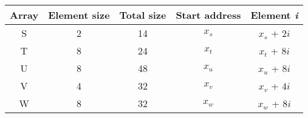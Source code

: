 \documentclass{article}
\begin{document}
\begin{tabular}{c c c c c}
	Array & Element size & Total size & Start address & Element \textit{i} \\
	\hline
	S & 2 & 14 & $x_s$ & $x_s$ + $2i$ \\
	T & 8 & 24 & $x_t$ & $x_t$ + $8i$ \\ 
	U & 8 & 48 & $x_u$ & $x_u$ + $8i$ \\
	V & 4 & 32 & $x_v$ & $x_v$ + $4i$ \\
	W & 8 & 32 & $x_w$ & $x_w$ + $8i$ \\
	\hline
\end{tabular}
\end{document}
